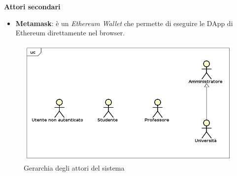 \textbf{Attori secondari}
	\begin{itemize}
		\item \textbf{Metamask}: è un \emph{Ethereum Wallet} che permette di eseguire le DApp di Ethereum direttamente nel browser.
	\end{itemize}
\begin{figure} [H]
	\centering
	\includegraphics[scale=0.4]{./img/Attori.png}
	\caption{Gerarchia degli attori del sistema }\label{}
\end{figure}


